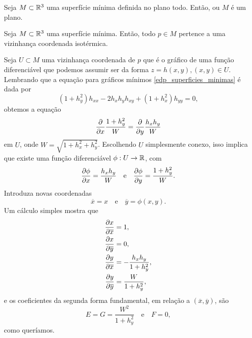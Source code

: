 \begin{teorema}
	Seja $M \subset \mathbb{R}^3$ uma superfície mínima definida no plano todo. Então, ou $M$ é um plano.
\end{teorema}


\begin{teorema}
	Seja $M \subset \mathbb{R}^3$ uma superfície mínima. Então, todo $p \in M$ pertence a uma vizinhança coordenada isotérmica.
\end{teorema}

\begin{demonstracao}
	Seja $U \subset M$ uma vizinhança coordenada de $p$ que é o gráfico de uma função diferenciável que podemos assumir ser da forma $z = h(x,y), (x,y) \in U$.
	Lembrando que a equação para gráficos mínimos \eqref{edp_superficies_minimas}  é dada por
	\begin{equation*}
	(1 + h_y^2) h_{xx} - 2 h_x h_y h_{xy} + (1 + h_x^2) h_{yy} = 0,
	\end{equation*}
	obtemos a equação
	\begin{equation*}
	\frac{\partial}{\partial x} \frac{1 + h_y^2}{W} = \frac{\partial}{\partial y} \frac{h_x h_y}{W}
	\end{equation*}
	em $U$, onde $W = \sqrt{1 + h_x^2 + h_y^2}$. Escolhendo $U$ simplesmente conexo, isso implica que existe uma função diferenciável $\phi: U \rightarrow \mathbb{R}$, com
	\begin{equation*}
	\frac{\partial \phi}{\partial x} = \frac{h_x h_y}{W} \quad \text{e} \quad
	\frac{\partial \phi}{\partial y} = \frac{1 + h_y^2}{W}.
	\end{equation*}
	Introduza novas coordenadas
	\begin{equation*}
	\overline{x} = x \quad \text{e} \quad
	\overline{y} = \phi(x,y).
	\end{equation*}
	Um cálculo simples mostra que
	\begin{align*}
	\frac{\partial x}{\partial \overline{x}} &= 1, \\
	\frac{\partial x}{\partial \overline{y}} &= 0, \\
	\frac{\partial y}{\partial \overline{x}} &= -\frac{h_x h_y}{1 + h_y^2}, \\
	\frac{\partial y}{\partial \overline{y}} &= \frac{W}{1 + h_y^2},
	\end{align*}
	e os coeficientes da segunda forma fundamental, em relação a $(\overline{x}, \overline{y})$, são
	\begin{equation*}
	E = G = \frac{W^2}{1 + h_y^2} \quad \text{e} \quad
	F = 0,
	\end{equation*}
	como queríamos.
\end{demonstracao}

